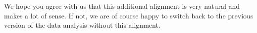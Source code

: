 \documentclass[a4paper,12pt]{article}
\begin{document}
\begin{enumerate}[label=(\roman*), leftmargin=0.8cm]
We hope you agree with us that this additional alignment is very natural and makes a lot of sense. If not, we are of course happy to switch back to the previous version of the data analysis without this alignment. 



\end{enumerate}





\end{document}
